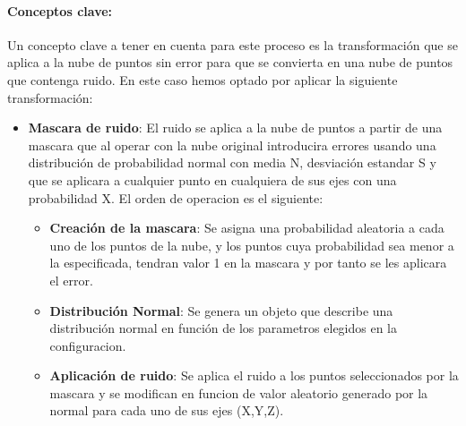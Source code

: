 \documentclass[12pt, a4paper, twoside]{article}
\begin{document}
\paragraph{Conceptos clave:} 
Un concepto clave a tener en cuenta para este proceso es la transformación que se aplica a la nube de puntos sin error para que se convierta en una nube de 
puntos que contenga ruido. En este caso hemos optado por aplicar la siguiente transformación:
\begin{itemize}
  \item \textbf{Mascara de ruido}: El ruido se aplica a la nube de puntos a partir de una mascara que al operar con la nube original introducira errores 
  usando una distribución de probabilidad normal con media N, desviación estandar S y que se aplicara a cualquier punto en cualquiera de sus ejes con una 
  probabilidad X. El orden de operacion es el siguiente:
  \begin{itemize}
    \item \textbf{Creación de la mascara}: Se asigna una probabilidad aleatoria a cada uno de los puntos de la nube, y los puntos cuya probabilidad sea menor
    a la especificada, tendran valor 1 en la mascara y por tanto se les aplicara el error.
    \item \textbf{Distribución Normal}: Se genera un objeto que describe una distribución normal en función de los parametros elegidos en la configuracion.
    \item \textbf{Aplicación de ruido}: Se aplica el ruido a los puntos seleccionados por la mascara y se modifican en funcion de valor aleatorio generado por 
    la normal para cada uno de sus ejes (X,Y,Z).
  \end{itemize}
\end{itemize}
\end{document}
